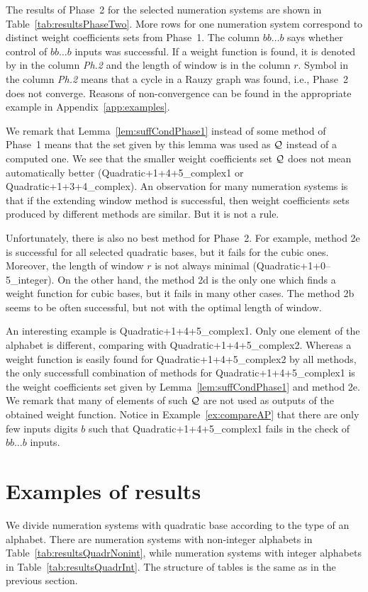 The results of Phase~2 for the selected numeration systems are shown in Table~\ref{tab:resultsPhaseTwo}. More rows for one numeration system correspond to distinct weight coefficients sets from Phase~1. The column $bb\dots b$ says whether control of $bb\dots b$ inputs was successful. If a weight function is found, it is denoted by \checkmark{} in the column \emph{Ph.2} and the length of window is in the column $r$. Symbol \xmark{} in the column \emph{Ph.2} means that a cycle in a Rauzy graph was found, i.e., Phase~2 does not converge. Reasons of non-convergence can be found in the appropriate example in Appendix~\ref{app:examples}.

We remark that Lemma~\ref{lem:suffCondPhase1} instead of some method of Phase~1 means that the set given by this lemma was used as $\mathcal{Q}$ instead of a computed one.  We see that the smaller weight coefficients set $\mathcal{Q}$ does not mean automatically better (Quadratic+1+4+5\_complex1 or Quadratic+1+3+4\_complex). An observation for many numeration systems is that if the extending window method is successful, then weight coefficients sets produced by different methods are similar. But it is not a rule. 

Unfortunately, there is also no best method for Phase~2. For example, method 2e is successful for all selected quadratic bases, but it fails for the cubic ones. Moreover, the length of window $r$ is not always minimal (Quadratic+1+0--5\_integer). On the other hand, the method 2d is the only one which finds a weight function for cubic bases, but it fails in many other cases. The method 2b seems to be often successful, but not with the optimal length of window.

An interesting example is Quadratic+1+4+5\_complex1. Only one element of the alphabet is different, comparing with Quadratic+1+4+5\_complex2. Whereas a weight function is easily found for Quadratic+1+4+5\_complex2 by all methods, the only successfull combination of methods for Quadratic+1+4+5\_complex1 is the weight coefficients set given by Lemma~\ref{lem:suffCondPhase1} and method 2e. We remark that many of elements of such $\mathcal{Q}$ are not used as outputs of the obtained weight function. Notice  in Example~\ref{ex:compareAP} that there are only few inputs digits $b$ such that  Quadratic+1+4+5\_complex1 fails in the check of $bb\dots b$ inputs.





\section{Examples of results}
\label{sec:resultsExamples}
We divide numeration systems with quadratic base according to the type of an alphabet. There are numeration systems with non-integer alphabets in Table~\ref{tab:resultsQuadrNonint}, while numeration systems with integer alphabets in Table~\ref{tab:resultsQuadrInt}. The structure of tables is the same as in the previous section. 

